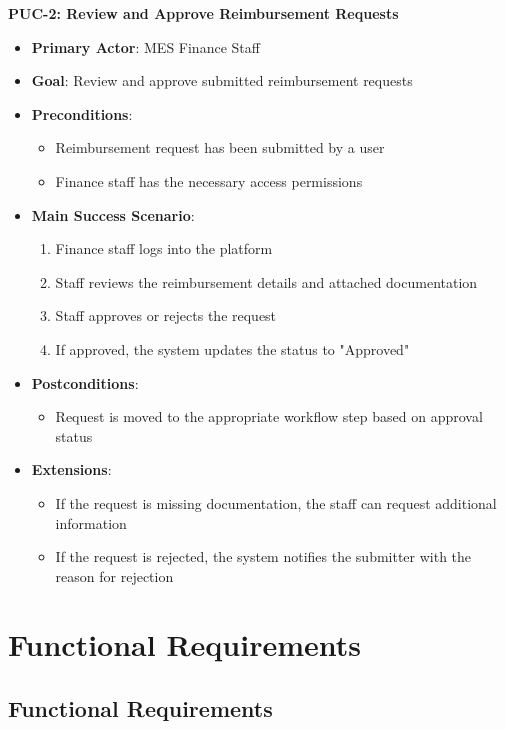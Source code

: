 \documentclass[12pt]{article}
\begin{document}
\textbf{PUC-2: Review and Approve Reimbursement Requests}
\begin{itemize}
    \item \textbf{Primary Actor}: MES Finance Staff
    \item \textbf{Goal}: Review and approve submitted reimbursement requests
    \item \textbf{Preconditions}:
    \begin{itemize}
        \item Reimbursement request has been submitted by a user
        \item Finance staff has the necessary access permissions
    \end{itemize}
    \item \textbf{Main Success Scenario}:
    \begin{enumerate}
        \item Finance staff logs into the platform
        \item Staff reviews the reimbursement details and attached documentation
        \item Staff approves or rejects the request
        \item If approved, the system updates the status to "Approved"
    \end{enumerate}
    \item \textbf{Postconditions}:
    \begin{itemize}
        \item Request is moved to the appropriate workflow step based on approval status
    \end{itemize}
    \item \textbf{Extensions}:
    \begin{itemize}
        \item If the request is missing documentation, the staff can request additional information
        \item If the request is rejected, the system notifies the submitter with the reason for rejection
    \end{itemize}
\end{itemize}


\section{Functional Requirements}
\subsection{Functional Requirements}
\end{document}
